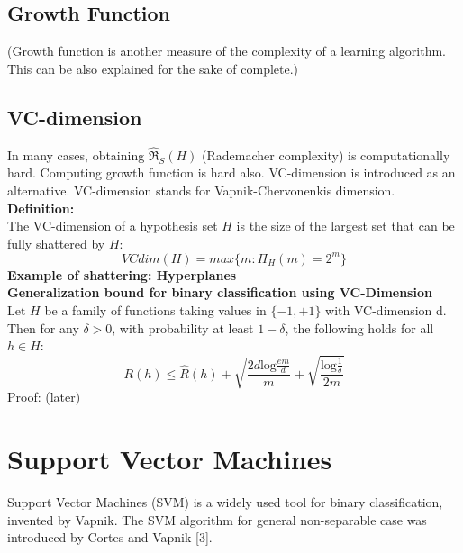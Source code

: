 \documentclass[12pt]{article}
\theoremstyle{definition}
\theoremstyle{remark}
\numberwithin{equation}{section}
\begin{document}
\subsection{Growth Function}
(Growth function is another measure of the complexity of a learning algorithm. This can be also explained for the sake of complete.)
\subsection{VC-dimension}
In many cases, obtaining $\mathfrak{\widehat{R}}_S(H)$ (Rademacher complexity) is computationally hard. Computing growth function is hard also. VC-dimension is introduced as an alternative. VC-dimension stands for Vapnik-Chervonenkis dimension.\\[0.2cm]
\textbf{Definition:}\\[0.2cm]
The VC-dimension of a hypothesis set $H$ is the size of the largest set that can be fully shattered by $H$:
\[VCdim(H) = max\{m:\Pi_H(m) = 2^m\}\]
\textbf{Example of shattering: Hyperplanes}\\[0.2cm]
\textbf{Generalization bound for binary classification using VC-Dimension}\\[0.2cm]
Let $H$ be a family of functions taking values in $\{-1,+1\}$ with VC-dimension d. Then for any $\delta > 0$, with probability at least $1-\delta$, the following holds for all $h \in H$:
\[R(h) \leq \widehat{R}(h) + \sqrt{\frac{2d\mathrm{log}\frac{em}{d}}{m}} + \sqrt{\frac{\mathrm{log}\frac{1}{\delta}}{2m}}\]
Proof: (later)
\section{Support Vector Machines}
Support Vector Machines (SVM) is a widely used tool for binary classification, invented by Vapnik. The SVM algorithm for general non-separable case was introduced by Cortes and Vapnik [3].
\end{document}
